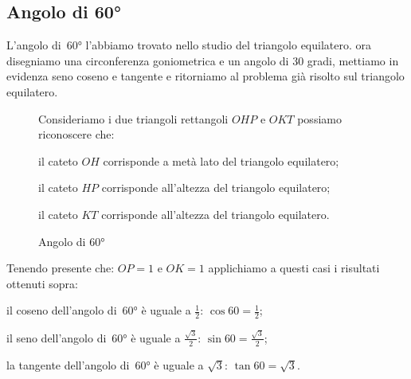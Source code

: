 \subsection{Angolo di 60°}

L'angolo di~60° l'abbiamo trovato nello studio del triangolo equilatero. ora 
disegniamo una circonferenza goniometrica e un angolo di 30 gradi, mettiamo in 
evidenza seno coseno e tangente e ritorniamo al problema già risolto sul 
triangolo equilatero.

 \begin{figure}[!h]
 \begin{minipage}{.45\textwidth}
  \begin{center}
\begin{inaccessibleblock}
    
    \caption{Angolo di 60°}
    \label{fig:trigo_angolo_60}
\end{inaccessibleblock}
  \end{center}
 \end{minipage}
 \begin{minipage}{.45\textwidth}
Consideriamo i due triangoli rettangoli $OHP$ e $OKT$ possiamo riconoscere che:
\begin{itemize*}
 \item il cateto $OH$ corrisponde a metà lato del triangolo equilatero; 
 \item il cateto $HP$ corrisponde all'altezza del triangolo equilatero;
 \item il cateto $KT$ corrisponde all'altezza del triangolo equilatero.
\end{itemize*}
 \end{minipage}
\vspace{-12pt}
\end{figure}

\vspace{-6pt}

Tenendo presente che: $OP=1$ e $OK=1$ applichiamo a questi casi i risultati 
ottenuti sopra:
\begin{itemize*}
 \item il coseno dell'angolo di~60° è uguale a $\frac{1}{2}$: 
  $\cos 60 = \frac{1}{2}$; 
 \item il seno dell'angolo di~60° è uguale a $\frac{\sqrt{3}}{2}$: 
  $\sin 60 = \frac{\sqrt{3}}{2}$; 
 \item la tangente dell'angolo di~60° è uguale a $\sqrt{3}$: 
  $\tan 60 = \sqrt{3}$.
\end{itemize*}

